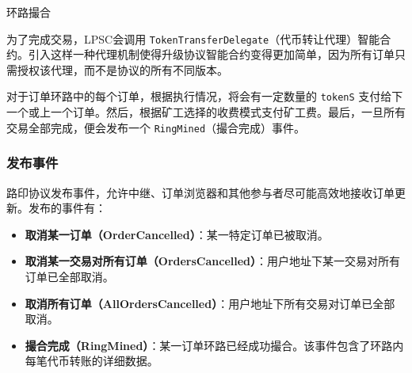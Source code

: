 \documentclass[UTF8]{ctexart}
\makeatletter
\newenvironment{figurehere}
 {\def\@captype{figure}}
 {}
\makeatother
\begin{document}
\begin{multicols}{2}
\begin{center}
\begin{figurehere}
\caption{环路撮合}
\label{fig:settlement}
\end{figurehere}
\end{center}

为了完成交易，LPSC会调用 \verb|TokenTransferDelegate|（代币转让代理）智能合约。引入这样一种代理机制使得升级协议智能合约变得更加简单，因为所有订单只需授权该代理，而不是协议的所有不同版本。

对于订单环路中的每个订单，根据执行情况，将会有一定数量的 \verb|tokenS| 支付给下一个或上一个订单。然后，根据矿工选择的收费模式支付矿工费。最后，一旦所有交易全部完成，便会发布一个 \verb|RingMined|（撮合完成）事件。

\subsubsection{发布事件\label{sec:events}}

路印协议发布事件，允许中继、订单浏览器和其他参与者尽可能高效地接收订单更新。发布的事件有：

\begin{itemize}
	\item \textbf{取消某一订单（OrderCancelled）}：某一特定订单已被取消。
	\item \textbf{取消某一交易对所有订单（OrdersCancelled）}：用户地址下某一交易对所有订单已全部取消。
	\item \textbf{取消所有订单（AllOrdersCancelled）}：用户地址下所有交易对订单已全部取消。
	\item \textbf{撮合完成（RingMined）}：某一订单环路已经成功撮合。该事件包含了环路内每笔代币转账的详细数据。
\end{itemize}



\end{multicols}
\end{document}
